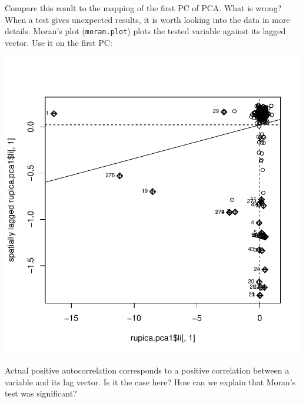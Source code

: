 \documentclass{article}
\begin{document}
\noindent Compare this result to the mapping of the first PC of PCA. What is wrong?
When a test gives unexpected results, it is worth looking into the data in more details.
Moran's plot (\texttt{moran.plot}) plots the tested variable against its lagged vector.
Use it on the first PC:
\begin{Schunk}
\end{Schunk}
\includegraphics{figs/spca-039}

\noindent Actual positive autocorrelation corresponds to a positive correlation between a variable
and its lag vector.
Is it the case here? How can we explain that Moran's test was significant?
\end{document}
